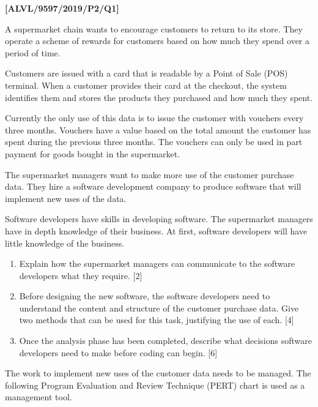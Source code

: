 \item \textbf{{[}ALVL/9597/2019/P2/Q1{]} }

A supermarket chain wants to encourage customers to return to its
store. They operate a scheme of rewards for customers based on how
much they spend over a period of time.

Customers are issued with a card that is readable by a Point of Sale
(POS) terminal. When a customer provides their card at the checkout,
the system identifies them and stores the products they purchased
and how much they spent.

Currently the only use of this data is to issue the customer with
vouchers every three months. Vouchers have a value based on the total
amount the customer has spent during the previous three months. The
vouchers can only be used in part payment for goods bought in the
supermarket.

The supermarket managers want to make more use of the customer purchase
data. They hire a software development company to produce software
that will implement new uses of the data.

Software developers have skills in developing software. The supermarket
managers have in depth knowledge of their business. At first, software
developers will have little knowledge of the business.
\begin{enumerate}
\item Explain how the supermarket managers can communicate to the software
developers what they require. \hfill{}{[}2{]}
\item Before designing the new software, the software developers need to
understand the content and structure of the customer purchase data.
Give two methods that can be used for this task, justifying the use
of each. \hfill{}{[}4{]}
\item Once the analysis phase has been completed, describe what decisions
software developers need to make before coding can begin. \hfill{}{[}6{]}
\end{enumerate}
The work to implement new uses of the customer data needs to be managed.
The following Program Evaluation and Review Technique (PERT) chart
is used as a management tool.

